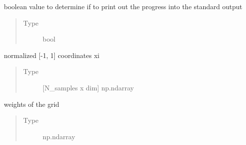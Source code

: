 \documentclass[letterpaper,10pt,english,openany,oneside]{sphinxmanual}
\begin{document}
\begin{fulllineitems}
\begin{fulllineitems}
\end{fulllineitems}


\begin{fulllineitems}
\label{\detokenize{pygpc:pygpc.grid.SparseGrid.verbose}}
boolean value to determine if to print out the progress into the standard output
\begin{quote}\begin{description}
\item[{Type}] \leavevmode
bool

\end{description}\end{quote}

\end{fulllineitems}


\begin{fulllineitems}
\label{\detokenize{pygpc:pygpc.grid.SparseGrid.coords_norm}}
normalized {[}-1, 1{]} coordinates xi
\begin{quote}\begin{description}
\item[{Type}] \leavevmode
{[}N\_samples x dim{]} np.ndarray

\end{description}\end{quote}

\end{fulllineitems}


\begin{fulllineitems}
\label{\detokenize{pygpc:pygpc.grid.SparseGrid.weights}}
weights of the grid
\begin{quote}\begin{description}
\item[{Type}] \leavevmode
np.ndarray

\end{description}\end{quote}

\end{fulllineitems}



\end{fulllineitems}
\end{document}

